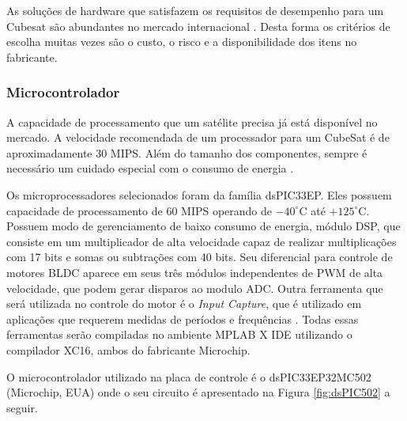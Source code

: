 \documentclass[
	12pt,				%
	openany,			%
	twoside,			%
	a4paper,			%
	english,			%
	french,				%
	spanish,			%
	brazil,				%
	oldfontcommands
	]{abntex2}
\begin{document}
As soluções de hardware que satisfazem os requisitos de desempenho para um Cubesat são abundantes no mercado internacional \cite{STATEOFART}. Desta forma os critérios de escolha muitas vezes são o custo, o risco e a disponibilidade dos itens no fabricante.

\subsubsection{Microcontrolador}

A capacidade de processamento que um satélite precisa já está disponível no mercado. A velocidade recomendada de um processador para um CubeSat é de aproximadamente 30 MIPS. Além do tamanho dos componentes, sempre é necessário um cuidado especial com o consumo de energia \cite{STATEOFART}.

Os microprocessadores selecionados foram da família dsPIC33EP. Eles possuem capacidade de processamento de 60 MIPS operando de $-40^{\circ}$C até $+125^{\circ}$C. Possuem modo de gerenciamento de baixo consumo de energia, módulo DSP, que consiste em um multiplicador de alta velocidade capaz de realizar multiplicações com 17 bits e somas ou subtrações com 40 bits. Seu diferencial para controle de motores BLDC aparece em seus três módulos independentes de PWM de alta velocidade, que podem gerar disparos ao modulo ADC. Outra ferramenta que será utilizada no controle do motor é o \textit{Input Capture}, que é utilizado em aplicações que requerem medidas de períodos e frequências \cite{dsPIC33EP}. Todas essas ferramentas serão compiladas no ambiente MPLAB X IDE utilizando o compilador XC16, ambos do fabricante Microchip.

O microcontrolador utilizado na placa de controle é o dsPIC33EP32MC502 (Microchip, EUA) onde o seu circuito é apresentado na Figura \ref{fig:dsPIC502} a seguir. 
\end{document}
